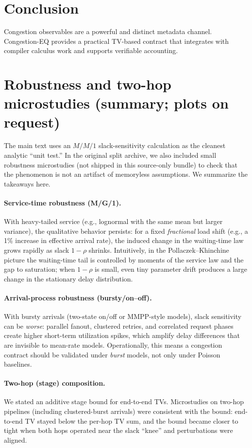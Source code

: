 \documentclass[11pt]{article}
\theoremstyle{definition}
\theoremstyle{remark}
\begin{document}
\section{Conclusion}
Congestion observables are a powerful and distinct metadata channel.
Congestion-EQ provides a practical TV-based contract that integrates with compiler calculus work and supports verifiable accounting.


\section{Robustness and two-hop microstudies (summary; plots on request)}\label{sec:congeq_robust}
The main text uses an $M/M/1$ slack-sensitivity calculation as the cleanest analytic ``unit test.''
In the original split archive, we also included small robustness microstudies (not shipped in this source-only bundle) to check that the phenomenon is not an artifact of memoryless assumptions.
We summarize the takeaways here.

\paragraph{Service-time robustness (M/G/1).}
With heavy-tailed service (e.g., lognormal with the same mean but larger variance), the qualitative behavior persists:
for a fixed \emph{fractional} load shift (e.g., a 1\% increase in effective arrival rate), the induced change in the waiting-time law grows rapidly as slack $1-\rho$ shrinks.
Intuitively, in the Pollaczek--Khinchine picture the waiting-time tail is controlled by moments of the service law and the gap to saturation; when $1-\rho$ is small, even tiny parameter drift produces a large change in the stationary delay distribution.

\paragraph{Arrival-process robustness (bursty/on--off).}
With bursty arrivals (two-state on/off or MMPP-style models), slack sensitivity can be \emph{worse}:
parallel fanout, clustered retries, and correlated request phases create higher short-term utilization spikes, which amplify delay differences that are invisible to mean-rate models.
Operationally, this means a congestion contract should be validated under \emph{burst} models, not only under Poisson baselines.

\paragraph{Two-hop (stage) composition.}
We stated an additive stage bound for end-to-end TVs.
Microstudies on two-hop pipelines (including clustered-burst arrivals) were consistent with the bound:
end-to-end TV stayed below the per-hop TV sum, and the bound became closer to tight when both hops operated near the slack ``knee'' and perturbations were aligned.
\end{document}
